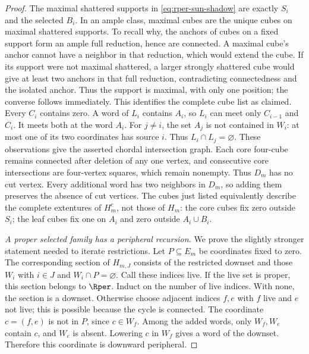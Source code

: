 \begin{proof}
The maximal shattered supports in \eqref{eq:rper-sun-shadow} are exactly
$S_i$ and the selected $B_i$. In an ample class, maximal cubes are the
unique cubes on maximal shattered supports. To recall why, the anchors
of cubes on a fixed support form an ample full reduction, hence are
connected. A maximal cube's anchor cannot have a neighbor in that
reduction, which would extend the cube. If its support were not maximal shattered, a larger strongly shattered
cube would give at least two anchors in that full reduction, contradicting
connectedness and the isolated anchor. Thus the support is maximal, with
only one position; the converse follows immediately.
This identifies the complete cube list as claimed.
Every $C_i$ contains zero. A word of $L_i$ contains $A_i$, so $L_i$ can
meet only $C_{i-1}$ and $C_i$. It meets both at the word $A_i$.
For $j\ne i$, the set $A_j$ is not contained in $W_i$: at most one of
its two coordinates has source $i$. Thus $L_i\cap L_j=\varnothing$.
These observations give the asserted chordal intersection graph.
Each core four-cube remains connected after deletion of any one vertex,
and consecutive core intersections are four-vertex squares, which remain
nonempty. Thus $D_m$ has no cut vertex. Every additional word has two
neighbors in $D_m$, so adding them preserves the absence of cut vertices.
The cubes just listed equivalently describe the complete extentures of
$H_m^c$, not those of $H_m$: the core cubes fix zero outside $S_i$;
the leaf cubes fix one on $A_i$ and zero outside $A_i\cup B_i$.

\emph{A proper selected family has a peripheral recursion.}
We prove the slightly stronger statement needed to iterate restrictions.
Let $P\subseteq E_m$ be coordinates fixed to zero. The corresponding
section of $H_{m,J}$ consists of the restricted downset and those $W_i$
with $i\in J$ and $W_i\cap P=\varnothing$. Call these indices live.
If the live set is proper, this section belongs to $\Rper$.
Induct on the number of live indices. With none, the section is a downset.
Otherwise choose adjacent indices $f,e$ with $f$ live and $e$ not live;
this is possible because the cycle is connected. The coordinate
$c=(f,e)$ is not in $P$, since $c\in W_f$.
Among the added words, only $W_f,W_e$ contain $c$, and $W_e$ is absent.
Lowering $c$ in $W_f$ gives a word of the downset. Therefore this
coordinate is downward peripheral.


\end{proof}
